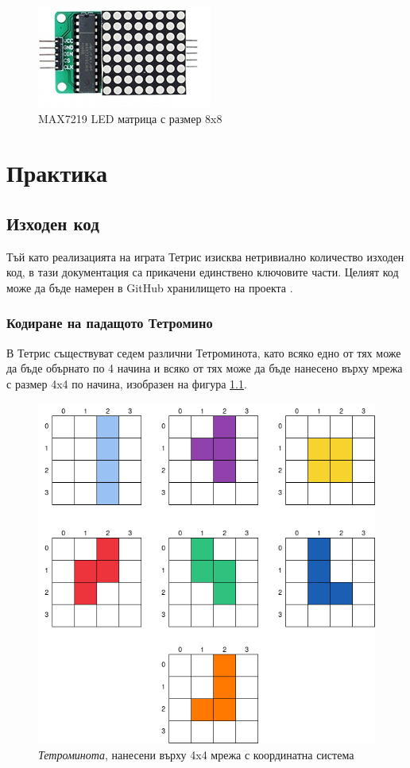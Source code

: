 \documentclass[titlepage, oneside, 14pt]{extbook}
\begin{document}
\begin{figure}[!htbp]
    \centering
    \includegraphics[width=0.5\linewidth]{img/display_generic.png}
    \caption{MAX7219 LED матрица с размер 8x8}
    \label{genericmod}
\end{figure}


\chapter{Практика}

\section{Изходен код}

Тъй като реализацията на играта Тетрис изисква нетривиално количество изходен код,
в тази документация са прикачени единствено ключовите части. Целият код може да
бъде намерен в GitHub хранилището на проекта \cite{github}.

\subsection{Кодиране на падащото Тетромино}

В Тетрис съществуват седем различни Тетроминота, като всяко едно от тях може да бъде обърнато по 4 начина и
всяко от тях може да бъде нанесено върху мрежа с размер 4x4 по начина, изобразен на фигура \ref{tetrogrid}.

\begin{figure}[!htbp]
    \centering
    \includegraphics[width=0.5\linewidth]{img/tetrominoes_grid.drawio.png}
    \caption{\textit{Тетроминота}, нанесени върху 4x4 мрежа с координатна система}
    \label{tetrogrid}
\end{figure}
\end{document}
